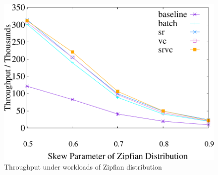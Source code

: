 \begin{figure}[t]
\quad
	\begin{minipage}[b]{0.31\linewidth}
	\centering
	\includegraphics[width=\textwidth]{./exp_fig/basic/tps}
	\vspace{-2em}
	\caption{Throughput under workloads of Zipfian distribution}
	\label{fig:basic:tps}
	\end{minipage}    
\end{figure}

